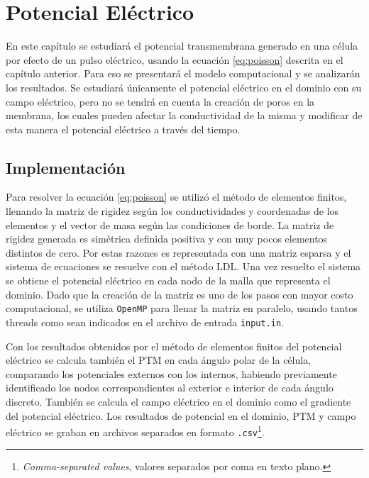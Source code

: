 \chapter{Potencial Eléctrico} \label{chap:itv}

En este capítulo se estudiará el potencial transmembrana generado en una célula por efecto de un pulso eléctrico, usando la ecuación \ref{eq:poisson} descrita en el capítulo anterior. Para eso se presentará el modelo computacional y se analizarán los resultados. Se estudiará únicamente el potencial eléctrico en el dominio con su campo eléctrico, pero no se tendrá en cuenta la creación de poros en la membrana, los cuales pueden afectar la conductividad de la misma y modificar de esta manera el potencial eléctrico a través del tiempo. 

\section{Implementación}

Para resolver la ecuación \ref{eq:poisson} se utilizó el método de elementos finitos, llenando la matriz de rigidez según los conductividades y coordenadas de los elementos y el vector de masa según las condiciones de borde. La matriz de rigidez generada es simétrica definida positiva y con muy pocos elementos distintos de cero. Por estas razones es representada con una matriz esparsa y el sistema de ecuaciones se resuelve con el método LDL. Una vez resuelto el sistema se obtiene el potencial eléctrico en cada nodo de la malla que representa el dominio. Dado que la creación de la matriz es uno de los pasos con mayor costo computacional, se utiliza \texttt{OpenMP} para llenar la matriz en paralelo, usando tantos threads como sean indicados en el archivo de entrada \texttt{input.in}.

Con los resultados obtenidos por el método de elementos finitos del potencial eléctrico se calcula también el PTM en cada ángulo polar de la célula, comparando los potenciales externos con los internos, habiendo previamente identificado los nodos correspondientes al exterior e interior de cada ángulo discreto. También se calcula el campo eléctrico en el dominio como el gradiente del potencial eléctrico. Los resultados de potencial en el dominio, PTM y campo eléctrico se graban en archivos separados en formato \texttt{.csv}\footnote{\textit{Comma-separated values}, valores separados por coma en texto plano.}. 

